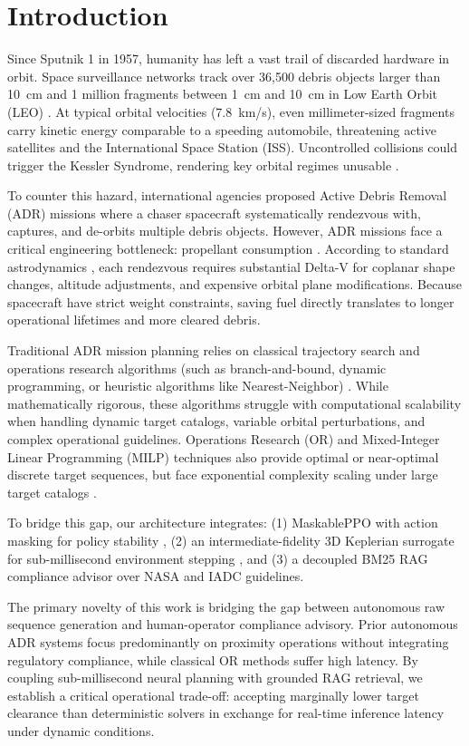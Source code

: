 \documentclass[10pt,conference,a4paper]{IEEEtran}
\begin{document}
\section{Introduction}
Since Sputnik 1 in 1957, humanity has left a vast trail of discarded hardware in orbit. Space surveillance networks track over 36,500 debris objects larger than 10~cm and 1 million fragments between 1~cm and 10~cm in Low Earth Orbit (LEO) \cite{esa}. At typical orbital velocities (7.8~km/s), even millimeter-sized fragments carry kinetic energy comparable to a speeding automobile, threatening active satellites and the International Space Station (ISS). Uncontrolled collisions could trigger the Kessler Syndrome, rendering key orbital regimes unusable \cite{kessler}.

To counter this hazard, international agencies proposed Active Debris Removal (ADR) missions where a chaser spacecraft systematically rendezvous with, captures, and de-orbits multiple debris objects. However, ADR missions face a critical engineering bottleneck: propellant consumption \cite{vallado}. According to standard astrodynamics \cite{esa}, each rendezvous requires substantial Delta-V for coplanar shape changes, altitude adjustments, and expensive orbital plane modifications. Because spacecraft have strict weight constraints, saving fuel directly translates to longer operational lifetimes and more cleared debris. 

Traditional ADR mission planning relies on classical trajectory search and operations research algorithms (such as branch-and-bound, dynamic programming, or heuristic algorithms like Nearest-Neighbor) \cite{shenoy, wang}. While mathematically rigorous, these algorithms struggle with computational scalability when handling dynamic target catalogs, variable orbital perturbations, and complex operational guidelines. Operations Research (OR) and Mixed-Integer Linear Programming (MILP) techniques also provide optimal or near-optimal discrete target sequences, but face exponential complexity scaling under large target catalogs \cite{xu2023adr}.

To bridge this gap, our architecture integrates: (1) MaskablePPO with action masking for policy stability \cite{stable-baselines,huang2020actionmasking}, (2) an intermediate-fidelity 3D Keplerian surrogate for sub-millisecond environment stepping \cite{vallado}, and (3) a decoupled BM25 RAG compliance advisor over NASA \cite{nasa-std} and IADC \cite{iadc-std} guidelines.

The primary novelty of this work is bridging the gap between autonomous raw sequence generation and human-operator compliance advisory. Prior autonomous ADR systems \cite{capra2022, yuan2022, retagne2024, poupon2024} focus predominantly on proximity operations without integrating regulatory compliance, while classical OR methods \cite{xu2023adr} suffer high latency. By coupling sub-millisecond neural planning with grounded RAG retrieval, we establish a critical operational trade-off: accepting marginally lower target clearance than deterministic solvers in exchange for real-time inference latency under dynamic conditions.
\end{document}
